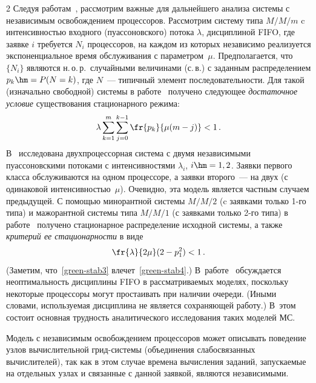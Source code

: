 \begin{multicols}{2}
Следуя работам~\cite{green80-1, green80, brill-green84}, рассмотрим важные
для дальнейшего анализа системы с независимым освобождением
процессоров. Рассмотрим систему
типа $M/M/m$ c интенсивностью входного (пуассоновского)  потока
$\lambda$, дисциплиной FIFO, где заявке $i$ требуется $N_i$
процессоров, на каждом из которых независимо реализуется
экспоненциальное  время обслуживания с параметром~$\mu$.
Предполагается, что  $\{N_i\}$ являются
н.\,о.\,р.\ случайными величинами
(с.\,в.)  с заданным распределением $p_k\hm=P(N=k)$, где  $N$~--- типичный
элемент последовательности. Для такой (изначально свободной) системы
в работе~\cite{green80} получено следующее {\it достаточное условие}
существования стационарного режима:
\begin{equation}
\label{green-stab3}
\lambda \sum\limits_{k=1}^m\sum_{j=0}^{k-1}
\fr{p_k}{\mu(m-j)}<1\,.
\end{equation}
В~\cite{brill-green84}  исследована  двухпроцессорная сис\-те\-ма с
двумя  независимыми пуассоновскими потоками с интенсивностями
$\lambda_i$, $i\hm=1,2$. Заявки первого класса обслуживаются на одном
процессоре, а заявки второго~--- на двух (с одинаковой
интенсивностью~$\mu$). Очевидно, эта модель является частным случаем
предыдущей. С помощью минорантной системы $M/M/2$ (c заявками только
1-го типа) и мажорантной системы типа $M/M/1$ (с заявками только
2-го типа) в работе~\cite{brill-green84} получено стационарное
распределение исходной системы, а также {\it критерий ее
стационарности}  в виде
\begin{equation}
\label{green-stab4}
 \fr{\lambda}{2\mu}(2-p_{1}^{2})<1\,.
\end{equation}
(Заметим, что~\eqref{green-stab3} влечет~\eqref{green-stab4}.) 
В~работе~\cite{green80-1} обсуждается неоптимальность  дисциплины FIFO
в рассматриваемых моделях, поскольку  некоторые процессоры могут
простаивать при наличии очереди. (Иными словами, используемая
дисциплина не является сохраняющей работу.)  В~этом состоит основная
трудность аналитического исследования таких моделей МС.

Модель с независимым освобождением процессоров может описывать
поведение узлов вычислительной грид-сис\-те\-мы (объединения
слабосвязанных вычислителей), так как в этом случае времена вычисления
заданий, запускаемые на отдельных узлах и связанные с данной
заявкой, являются  независимыми.


\end{multicols}
